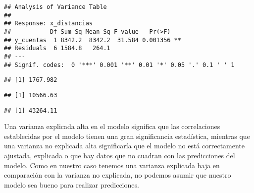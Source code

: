 \documentclass[
]{article}
\newenvironment{Shaded}{\begin{snugshade}}{\end{snugshade}}
\newcommand{\DecValTok}[1]{\textcolor[rgb]{0.00,0.00,0.81}{#1}}
\newcommand{\FunctionTok}[1]{\textcolor[rgb]{0.00,0.00,0.00}{#1}}
\newcommand{\NormalTok}[1]{#1}
\newcommand{\OtherTok}[1]{\textcolor[rgb]{0.56,0.35,0.01}{#1}}
\newcommand{\SpecialCharTok}[1]{\textcolor[rgb]{0.00,0.00,0.00}{#1}}
\begin{document}
\begin{verbatim}
## Analysis of Variance Table
## 
## Response: x_distancias
##           Df Sum Sq Mean Sq F value   Pr(>F)   
## y_cuentas  1 8342.2  8342.2  31.584 0.001356 **
## Residuals  6 1584.8   264.1                    
## ---
## Signif. codes:  0 '***' 0.001 '**' 0.01 '*' 0.05 '.' 0.1 ' ' 1
\end{verbatim}

\begin{Shaded}
\end{Shaded}

\begin{verbatim}
## [1] 1767.982
\end{verbatim}

\begin{Shaded}
\end{Shaded}

\begin{verbatim}
## [1] 10566.63
\end{verbatim}

\begin{Shaded}
\end{Shaded}

\begin{verbatim}
## [1] 43264.11
\end{verbatim}

Una varianza explicada alta en el modelo significa que las correlaciones
establecidas por el modelo tienen una gran significancia estadística,
mientras que una varianza no explicada alta significaría que el modelo
no está correctamente ajustada, explicada o que hay datos que no cuadran
con las predicciones del modelo. Como en nuestro caso tenemos una
varianza explicada baja en comparación con la varianza no explicada, no
podemos asumir que nuestro modelo sea bueno para realizar predicciones.
\end{document}
